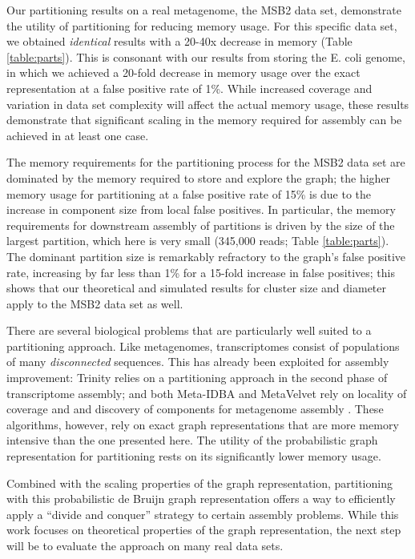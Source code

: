 \documentclass{pnastwo}
\begin{document}
\begin{article}
Our partitioning results on a real metagenome, the MSB2 data set,
demonstrate the utility of partitioning for reducing memory usage.
For this specific data set, we obtained {\em identical} results with a
20-40x decrease in memory (Table \ref{table:parts}).  This is consonant with our results from
storing the E. coli genome, in which we achieved a 20-fold decrease
in memory usage over the exact representation at a false positive rate
of 1\%.  While increased coverage and variation in data set complexity
will affect the actual memory usage, these results demonstrate that
significant scaling in the memory required for assembly can be achieved
in at least one case.

The memory requirements for the partitioning process for the MSB2 data
set are dominated by the memory required to store and explore the
graph; the higher memory usage for partitioning at a false positive rate
of 15\% is due to the increase in component size from local false
positives.  In particular, the memory requirements for downstream assembly
of partitions is driven by the size of the largest partition, which
here is very small (345,000 reads; Table \ref{table:parts}).  The
dominant partition size is remarkably refractory to the graph's false
positive rate, increasing by far less than 1\% for a 15-fold increase
in false positives; this shows that our theoretical and
simulated results for cluster size and diameter apply to the MSB2 data set
as well.


There are several biological problems that are particularly well
suited to a partitioning approach.  Like metagenomes, transcriptomes
consist of populations of many {\em disconnected} sequences.  This has
already been exploited for assembly improvement: Trinity relies on a
partitioning approach in the second phase of transcriptome assembly;
and both Meta-IDBA and MetaVelvet rely on locality of coverage and and
discovery of components for metagenome assembly
\cite{trinity,pubmed21685107,metavelvet}.  These algorithms, however,
rely on exact graph representations that are more memory intensive
than the one presented here.  The utility of the probabilistic graph
representation for partitioning rests on its significantly lower
memory usage.

Combined with the scaling
properties of the graph representation, partitioning with this probabilistic
de Bruijn graph representation offers a way to
efficiently apply a ``divide and conquer'' strategy to certain
assembly problems.  While this work focuses on theoretical properties
of the graph representation, the next step will be to evaluate the approach
on many real data sets.


\end{article}
\end{document}

